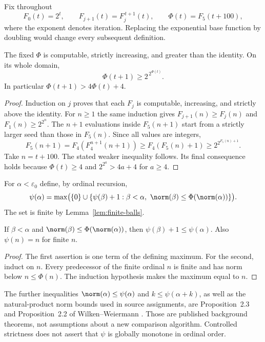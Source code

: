 Fix throughout
\begin{equation}\label{eq:phi-definition}
 F_0(t)=2^t,\qquad F_{j+1}(t)=F_j^{\,t+1}(t),\qquad
 \Phi(t)=F_5(t+100),
\end{equation}
where the exponent denotes iteration.  Replacing the exponential base
function by doubling would change every subsequent definition.

\begin{lemma}\label{lem:phi-growth}
The fixed $\Phi$ is computable, strictly increasing, and greater than the
identity.  On its whole domain,
\[
 \Phi(t+1)\ge 2^{\,2^{\Phi(t)}}.
\]
In particular $\Phi(t+1)>4\Phi(t)+4$.
\end{lemma}
\begin{proof}
Induction on $j$ proves that each $F_j$ is computable, increasing, and
strictly above the identity.  For $n\ge1$ the same induction gives
$F_{j+1}(n)\ge F_j(n)$ and $F_1(n)\ge2^{2^n}$.  The $n+1$ evaluations
inside $F_5(n+1)$ start from a strictly larger seed than those in $F_5(n)$.
Since all values are integers,
\[
 F_5(n+1)=F_4(F_4^{n+1}(n+1))\ge F_4(F_5(n)+1)
             \ge2^{2^{F_5(n)+1}}.
\]
Take $n=t+100$.  The stated weaker inequality follows.  Its final consequence
holds because $\Phi(t)\ge4$ and $2^{2^a}>4a+4$ for $a\ge4$.
\end{proof}

\begin{definition}\label{def:collapse}
For $\alpha<\varepsilon_0$ define, by ordinal recursion,
\[
 \psi(\alpha)=\max\bigl(\{0\}\cup
 \{\psi(\beta)+1:\beta<\alpha,\ %
                 \norm(\beta)\le\Phi(\norm(\alpha))\}\bigr).
\]
The set is finite by Lemma~\ref{lem:finite-balls}.
\end{definition}

\begin{lemma}\label{lem:controlled-strictness}
If $\beta<\alpha$ and
$\norm(\beta)\le\Phi(\norm(\alpha))$, then
$\psi(\beta)+1\le\psi(\alpha)$.  Also $\psi(n)=n$ for finite $n$.
\end{lemma}
\begin{proof}
The first assertion is one term of the defining maximum.  For the second,
induct on $n$.  Every predecessor of the finite ordinal $n$ is finite and
has norm below $n\le\Phi(n)$.  The induction hypothesis makes the maximum
equal to $n$.
\end{proof}

The further inequalities $\norm(\alpha)\le\psi(\alpha)$ and
$k\le\psi(\alpha+k)$, as well as the natural-product norm bounds used
in source assignments, are Proposition~2.3 and Proposition~2.2 of
Wilken--Weiermann \cite{ww}.  Those are published background theorems,
not assumptions about a new comparison algorithm.  Controlled strictness
does not assert that $\psi$ is globally monotone in ordinal order.

